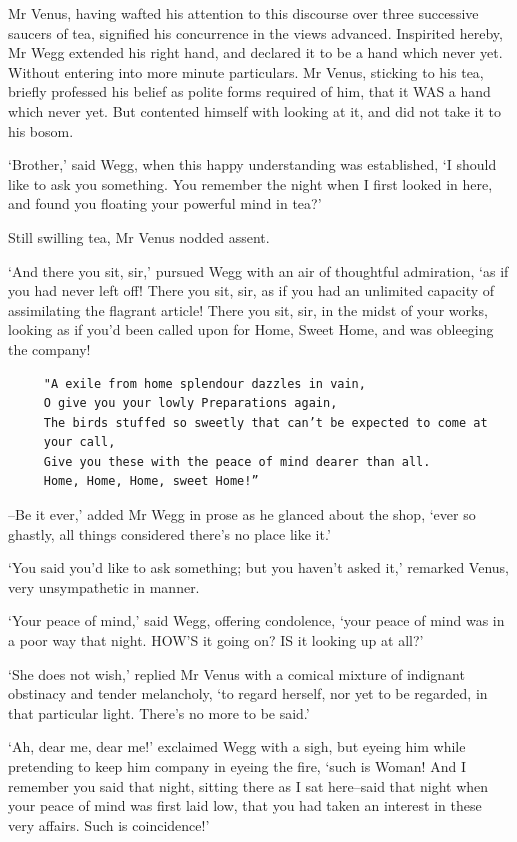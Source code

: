 Mr Venus, having wafted his attention to this discourse over three
successive saucers of tea, signified his concurrence in the views
advanced. Inspirited hereby, Mr Wegg extended his right hand, and
declared it to be a hand which never yet. Without entering into more
minute particulars. Mr Venus, sticking to his tea, briefly professed his
belief as polite forms required of him, that it WAS a hand which never
yet. But contented himself with looking at it, and did not take it to
his bosom.

‘Brother,’ said Wegg, when this happy understanding was established, ‘I
should like to ask you something. You remember the night when I first
looked in here, and found you floating your powerful mind in tea?’

Still swilling tea, Mr Venus nodded assent.

‘And there you sit, sir,’ pursued Wegg with an air of thoughtful
admiration, ‘as if you had never left off! There you sit, sir, as if you
had an unlimited capacity of assimilating the flagrant article! There
you sit, sir, in the midst of your works, looking as if you’d been
called upon for Home, Sweet Home, and was obleeging the company!

\begin{verbatim}
     "A exile from home splendour dazzles in vain,
     O give you your lowly Preparations again,
     The birds stuffed so sweetly that can’t be expected to come at
     your call,
     Give you these with the peace of mind dearer than all.
     Home, Home, Home, sweet Home!”
\end{verbatim}

--Be it ever,’ added Mr Wegg in prose as he glanced about the shop,
‘ever so ghastly, all things considered there’s no place like it.’

‘You said you’d like to ask something; but you haven’t asked it,’
remarked Venus, very unsympathetic in manner.

‘Your peace of mind,’ said Wegg, offering condolence, ‘your peace of
mind was in a poor way that night. HOW’S it going on? IS it looking up
at all?’

‘She does not wish,’ replied Mr Venus with a comical mixture of
indignant obstinacy and tender melancholy, ‘to regard herself, nor yet
to be regarded, in that particular light. There’s no more to be said.’

‘Ah, dear me, dear me!’ exclaimed Wegg with a sigh, but eyeing him while
pretending to keep him company in eyeing the fire, ‘such is Woman! And
I remember you said that night, sitting there as I sat here--said that
night when your peace of mind was first laid low, that you had taken an
interest in these very affairs. Such is coincidence!’

